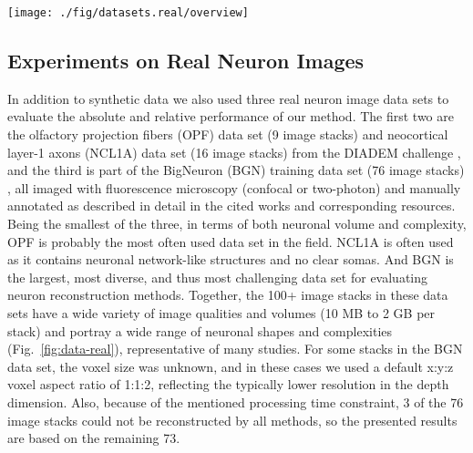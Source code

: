 \begin{figure*}[t!]
\centering
\texttt{[image: ./fig/datasets.real/overview]}
\caption{Illustration of the real neuron image data sets used in the presented experiments. Examples are shown of (A) the OPF data set (4 of 9 stacks), (B) the NCL1A data set (6 of 16 stacks), and (C) the BGN data set (13 of 76 stacks). Each example shows the maximum intensity projection of the image stack (left panel) but with inverted intensities for better visualization, and the corresponding manual reconstruction (right panel) as a surface rendering (in red), both generated using Vaa3D \citep{peng2010v3d}.}
\label{fig:data-real}
\end{figure*}

\subsection{Experiments on Real Neuron Images}
\label{subsec:eval-real}
In addition to synthetic data we also used three real neuron image data sets to evaluate the absolute and relative performance of our method. The first two are the olfactory projection fibers (OPF) data set (9 image stacks) and neocortical layer-1 axons (NCL1A) data set (16 image stacks) from the DIADEM challenge \citep{brown2011diadem}, and the third is part of the BigNeuron (BGN) training data set (76 image stacks) \citep{peng2015bigneuron}, all imaged with fluorescence microscopy (confocal or two-photon) and manually annotated as described in detail in the cited works and corresponding resources. Being the smallest of the three, in terms of both neuronal volume and complexity, OPF is probably the most often used data set in the field. NCL1A is often used as it contains neuronal network-like structures and no clear somas. And BGN is the largest, most diverse, and thus most challenging data set for evaluating neuron reconstruction methods. Together, the 100+ image stacks in these data sets have a wide variety of image qualities and volumes (10 MB to 2 GB per stack) and portray a wide range of neuronal shapes and complexities (Fig.~\ref{fig:data-real}), representative of many studies. For some stacks in the BGN data set, the voxel size was unknown, and in these cases we used a default x:y:z voxel aspect ratio of 1:1:2, reflecting the typically lower resolution in the depth dimension. Also, because of the mentioned processing time constraint, 3 of the 76 image stacks could not be reconstructed by all methods, so the presented results are based on the remaining 73.

